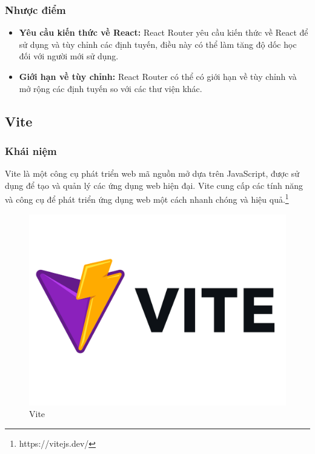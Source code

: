 \subsubsection{Nhược điểm}
\begin{itemize}
  \item \textbf{Yêu cầu kiến thức về React:} React Router yêu cầu kiến thức về React để sử dụng và tùy chỉnh các định tuyến, điều này có thể làm tăng độ dốc học đối với người mới sử dụng.
  \item \textbf{Giới hạn về tùy chỉnh:} React Router có thể có giới hạn về tùy chỉnh và mở rộng các định tuyến so với các thư viện khác.
\end{itemize}
\subsection{Vite}
\subsubsection{Khái niệm}
\noindent Vite là một công cụ phát triển web mã nguồn mở dựa trên JavaScript, được sử dụng để tạo và quản lý các ứng dụng web hiện đại. Vite cung cấp các tính năng và công cụ để phát triển ứng dụng web một cách nhanh chóng và hiệu quả.\footnote{https://vitejs.dev/}
\begin{figure}[H]
  \begin{center}
    \includegraphics[scale=0.35]{images/hieu/phuluc/vite.png}
    \caption{Vite}
  \end{center}
\end{figure}
